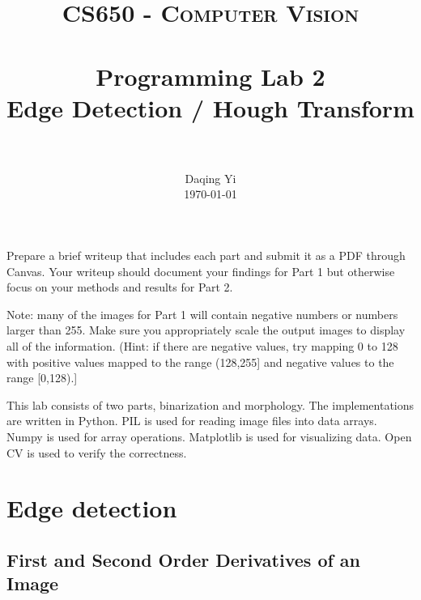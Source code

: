 \documentclass[paper=a4, fontsize=11pt]{scrartcl}
\title{
		\usefont{OT1}{bch}{b}{n}
		\normalfont \normalsize \textsc{CS650 - Computer Vision} \\ [25pt]
		\horrule{0.5pt} \\[0.4cm]
		\huge Programming Lab 2 \\ Edge Detection / Hough Transform \\
		\horrule{2pt} \\[0.5cm]
}
\author{
		\normalfont 								\normalsize
        Daqing Yi\\[-3pt]		\normalsize
        \today
}
\date{}
\numberwithin{equation}{section}		%
\numberwithin{figure}{section}			%
\begin{document}
\maketitle

Prepare a brief writeup that includes each part and submit it as a PDF through Canvas.
Your writeup should document your findings for Part 1 but otherwise focus on your methods and results for Part 2.

Note: many of the images for Part 1 will contain negative numbers or numbers larger than 255.
Make sure you appropriately scale the output images to display all of the information.
(Hint: if there are negative values, try mapping 0 to 128 with positive values mapped to the range (128,255] and negative values to the range [0,128).]

This lab consists of two parts, binarization and morphology.
The implementations are written in Python.
PIL is used for reading image files into data arrays.
Numpy is used for array operations.
Matplotlib is used for visualizing data.
Open CV is used to verify the correctness.

\section{Edge detection}

\subsection{First and Second Order Derivatives of an Image}
\end{document}

